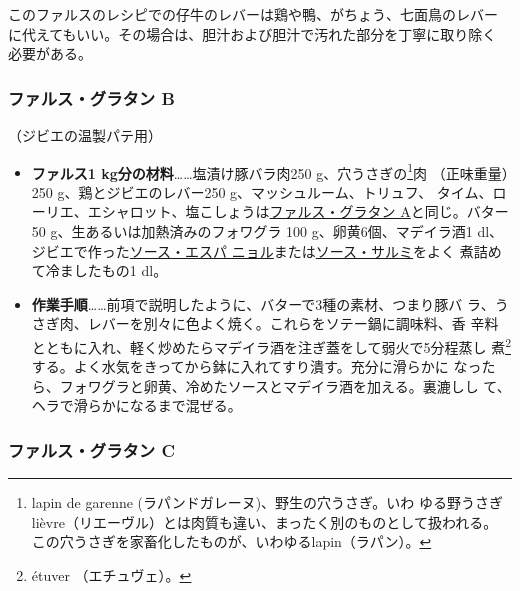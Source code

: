 \begin{recette}
このファルスのレシピでの仔牛のレバーは鶏や鴨、がちょう、七面鳥のレバー
に代えてもいい。その場合は、胆汁および胆汁で汚れた部分を丁寧に取り除く
必要がある。

\maeaki

\hypertarget{farce-gratin-b}{%
\subsubsection{ファルス・グラタン B}\label{farce-gratin-b}}


（ジビエの温製パテ用）


\begin{itemize}
\item
  \textbf{ファルス1 kg分の材料}\ldots{}\ldots{}塩漬け豚バラ肉250
  g、穴うさぎの\footnote{lapin de garenne
    (ラパンドガレーヌ)、野生の穴うさぎ。いわ
    ゆる野うさぎlièvre（リエーヴル）とは肉質も違い、まったく別のものとして扱われる。
    この穴うさぎを家畜化したものが、いわゆるlapin（ラパン）。}肉
  （正味重量）250 g、鶏とジビエのレバー250 g、マッシュルーム、トリュフ、
  タイム、ローリエ、エシャロット、塩こしょうは\protect\hyperlink{farce-gratin-a}{ファルス・グラタン
  A}と同じ。バター50 g、生あるいは加熱済みのフォワグラ 100
  g、卵黄6個、マデイラ酒1\undemi{}
  dl、ジビエで作った\protect\hyperlink{sauce-espagnole}{ソース・エスパ
  ニョル}または\protect\hyperlink{sauce-salmis}{ソース・サルミ}をよく
  煮詰めて冷ましたもの1\undemi{} dl。
\item
  \textbf{作業手順}\ldots{}\ldots{}前項で説明したように、バターで3種の素材、つまり豚バ
  ラ、うさぎ肉、レバーを別々に色よく焼く。これらをソテー鍋に調味料、香
  辛料とともに入れ、軽く炒めたらマデイラ酒を注ぎ蓋をして弱火で5分程蒸し
  煮\footnote{étuver （エチュヴェ）。}する。よく水気をきってから鉢に入れてすり潰す。充分に滑らかに
  なったら、フォワグラと卵黄、冷めたソースとマデイラ酒を加える。裏漉しし
  て、ヘラで滑らかになるまで混ぜる。
\end{itemize}

\maeaki

\hypertarget{farce-gratin-c}{%
\subsubsection{ファルス・グラタン C}\label{farce-gratin-c}}


\end{recette}
